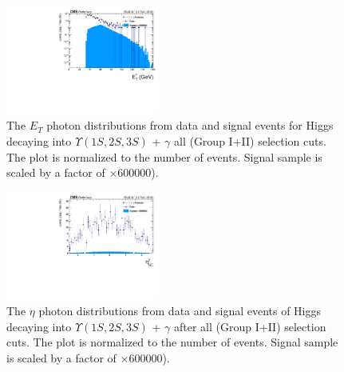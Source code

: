 \begin{figure}[!htbp]
\begin{center}
\includegraphics[width=0.45\textwidth]{figures_and_tables/outputPlots/HtoUpsilon_Cat0_ZZZZZ/nEvts/data_x_mc/withKinCuts/h_withKin_Photon_pt}\hspace*{1.cm}
\end{center}\vspace*{-.5cm}
\caption{The $E_{T}$ photon distributions from data and signal events for Higgs decaying into $\Upsilon(1S,2S,3S)$ + $\gamma$ all (Group I+II) selection cuts. The plot is normalized to the number of events. Signal sample is scaled by a factor of $\times 600000$).}
\label{fig:pTPhoton_HtoUpsilon_Cat0_groupI_plus_II}
\end{figure}


\begin{figure}[!htbp]
\begin{center}
\includegraphics[width=0.45\textwidth]{figures_and_tables/outputPlots/HtoUpsilon_Cat0_ZZZZZ/nEvts/data_x_mc/withKinCuts/h_withKin_Photon_eta}\hspace*{1.cm}
\end{center}\vspace*{-.5cm}
\caption{The $\eta$ photon distributions from data and signal events of Higgs decaying into $\Upsilon(1S,2S,3S)$ + $\gamma$ after all (Group I+II) selection cuts. The plot is normalized to the number of events. Signal sample is scaled by a factor of $\times 600000$).}
\label{fig:etaPhoton_HtoUpsilon_Cat0_groupI_plus_II}
\end{figure}

